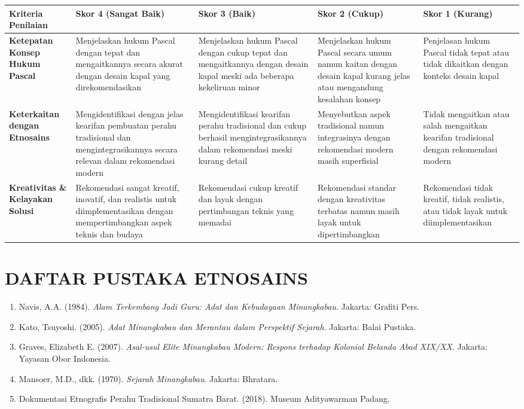 \documentclass[12pt,a4paper]{article}
\begin{document}
\begin{longtable}{|p{3cm}|p{3cm}|p{3cm}|p{3cm}|p{3cm}|}
\hline
\textbf{Kriteria Penilaian} & \textbf{Skor 4 (Sangat Baik)} & \textbf{Skor 3 (Baik)} & \textbf{Skor 2 (Cukup)} & \textbf{Skor 1 (Kurang)} \\
\hline
\textbf{Ketepatan Konsep Hukum Pascal} & Menjelaskan hukum Pascal dengan tepat dan mengaitkannya secara akurat dengan desain kapal yang direkomendasikan & Menjelaskan hukum Pascal dengan cukup tepat dan mengaitkannya dengan desain kapal meski ada beberapa kekeliruan minor & Menjelaskan hukum Pascal secara umum namun kaitan dengan desain kapal kurang jelas atau mengandung kesalahan konsep & Penjelasan hukum Pascal tidak tepat atau tidak dikaitkan dengan konteks desain kapal \\
\hline
\textbf{Keterkaitan dengan Etnosains} & Mengidentifikasi dengan jelas kearifan pembuatan perahu tradisional dan mengintegrasikannya secara relevan dalam rekomendasi modern & Mengidentifikasi kearifan perahu tradisional dan cukup berhasil mengintegrasikannya dalam rekomendasi meski kurang detail & Menyebutkan aspek tradisional namun integrasinya dengan rekomendasi modern masih superfisial & Tidak mengaitkan atau salah mengaitkan kearifan tradisional dengan rekomendasi modern \\
\hline
\textbf{Kreativitas \& Kelayakan Solusi} & Rekomendasi sangat kreatif, inovatif, dan realistis untuk diimplementasikan dengan mempertimbangkan aspek teknis dan budaya & Rekomendasi cukup kreatif dan layak dengan pertimbangan teknis yang memadai & Rekomendasi standar dengan kreativitas terbatas namun masih layak untuk dipertimbangkan & Rekomendasi tidak kreatif, tidak realistis, atau tidak layak untuk diimplementasikan \\
\hline
\end{longtable}

\vspace{1cm}

\section{DAFTAR PUSTAKA ETNOSAINS}

\begin{enumerate}
\item Navis, A.A. (1984). \textit{Alam Terkembang Jadi Guru: Adat dan Kebudayaan Minangkabau}. Jakarta: Grafiti Pers.
\item Kato, Tsuyoshi. (2005). \textit{Adat Minangkabau dan Merantau dalam Perspektif Sejarah}. Jakarta: Balai Pustaka.
\item Graves, Elizabeth E. (2007). \textit{Asal-usul Elite Minangkabau Modern: Respons terhadap Kolonial Belanda Abad XIX/XX}. Jakarta: Yayasan Obor Indonesia.
\item Mansoer, M.D., dkk. (1970). \textit{Sejarah Minangkabau}. Jakarta: Bhratara.
\item Dokumentasi Etnografis Perahu Tradisional Sumatra Barat. (2018). Museum Adityawarman Padang.
\end{enumerate}
\end{document}
